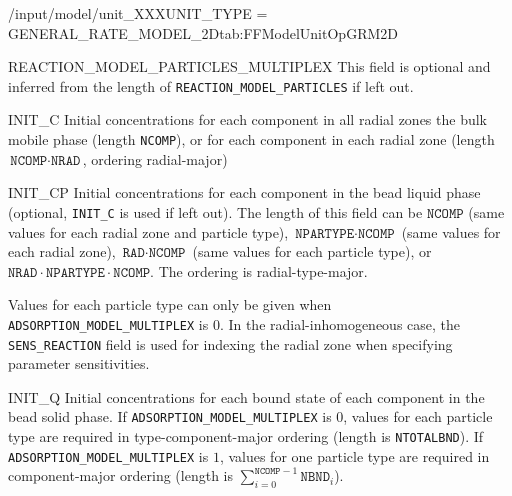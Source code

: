 \begin{condsubgroup}{/input/model/unit\_XXX}{UNIT\_TYPE = GENERAL\_RATE\_MODEL\_2D}{tab:FFModelUnitOpGRM2D}
\begin{dataset}[unit=--,type=int,range={$\{0, 1\}$},length={1}]{REACTION\_MODEL\_PARTICLES\_MULTIPLEX}
    This field is optional and inferred from the length of \texttt{REACTION\_MODEL\_PARTICLES} if left out.
  \end{dataset}
  \begin{dataset}[unit=\si{\mol\per\cubic\metre\of{IV}},type=double,range={$\geq 0$},length={$\texttt{NCOMP}$ / $\texttt{NCOMP} \cdot \texttt{NRAD}$}]{INIT\_C}
    Initial concentrations for each component in all radial zones the bulk mobile phase (length \texttt{NCOMP}), or for each component in each radial zone (length $\texttt{NCOMP} \cdot \texttt{NRAD}$, ordering radial-major)
  \end{dataset}
  \begin{dataset}[unit=\si{\mol\per\cubic\metre\of{MP}},type=double,range={$\geq 0$}]{INIT\_CP}
    Initial concentrations for each component in the bead liquid phase (optional, \texttt{INIT\_C} is used if left out).
    The length of this field can be $\texttt{NCOMP}$ (same values for each radial zone and particle type), $\texttt{NPARTYPE} \cdot \texttt{NCOMP}$ (same values for each radial zone), $\texttt{RAD} \cdot \texttt{NCOMP}$ (same values for each particle type), or $\texttt{NRAD} \cdot \texttt{NPARTYPE} \cdot \texttt{NCOMP}$.
    The ordering is radial-type-major.

    Values for each particle type can only be given when \texttt{ADSORPTION\_MODEL\_MULTIPLEX} is $0$.
    In the radial-inhomogeneous case, the \texttt{SENS\_REACTION} field is used for indexing the radial zone when specifying parameter sensitivities.
  \end{dataset}
  \begin{dataset}[unit=\si{\mol\per\cubic\metre\of{SP}},type=double,range={$\geq 0$}]{INIT\_Q}
    Initial concentrations for each bound state of each component in the bead solid phase.
    If \texttt{ADSORPTION\_MODEL\_MULTIPLEX} is $0$, values for each particle type are required in type-component-major ordering (length is \texttt{NTOTALBND}).
    If \texttt{ADSORPTION\_MODEL\_MULTIPLEX} is $1$, values for one particle type are required in component-major ordering (length is $\sum_{i = 0}^{\texttt{NCOMP} - 1} \texttt{NBND}_i$).


\end{dataset}
\end{condsubgroup}
